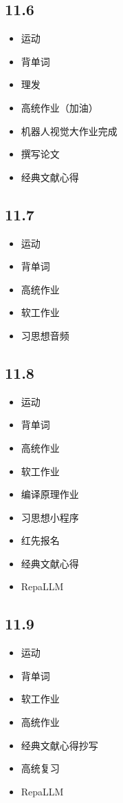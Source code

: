 \documentclass[UTF8]{ctexart}
\begin{document}
\subsection*{11.6}
\begin{itemize}
    \item 运动
    \item 背单词
    \item 理发
    \item 高统作业（加油）
    \item 机器人视觉大作业完成
    \item 撰写论文
    \item 经典文献心得
\end{itemize}

\subsection*{11.7}
\begin{itemize}
    \item 运动
    \item 背单词
    \item 高统作业
    \item 软工作业
    \item 习思想音频
\end{itemize}

\subsection*{11.8}
\begin{itemize}
    \item 运动
    \item 背单词
    \item 高统作业
    \item 软工作业
    \item 编译原理作业
    \item 习思想小程序
    \item 红先报名
    \item 经典文献心得
    \item RepaLLM
\end{itemize}

\subsection*{11.9}
\begin{itemize}
    \item 运动
    \item 背单词
    \item 软工作业
    \item 高统作业
    \item 经典文献心得抄写
    \item 高统复习
    \item RepaLLM
\end{itemize}
\end{document}
